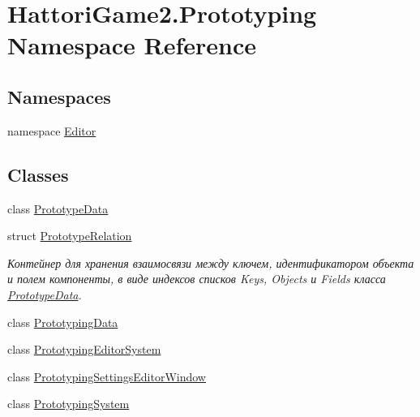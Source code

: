 \hypertarget{namespace_hattori_game2_1_1_prototyping}{}\section{Hattori\+Game2.\+Prototyping Namespace Reference}
\label{namespace_hattori_game2_1_1_prototyping}
\subsection*{Namespaces}
\begin{DoxyCompactItemize}
\item 
namespace \hyperlink{namespace_hattori_game2_1_1_prototyping_1_1_editor}{Editor}
\end{DoxyCompactItemize}
\subsection*{Classes}
\begin{DoxyCompactItemize}
\item 
class \hyperlink{class_hattori_game2_1_1_prototyping_1_1_prototype_data}{Prototype\+Data}
\item 
struct \hyperlink{struct_hattori_game2_1_1_prototyping_1_1_prototype_relation}{Prototype\+Relation}
\begin{DoxyCompactList}\small\item\em Контейнер для хранения взаимосвязи между ключем, идентификатором объекта и полем компоненты, в виде индексов списков {\ttfamily Keys}, {\ttfamily Objects} и {\ttfamily Fields} класса \hyperlink{class_hattori_game2_1_1_prototyping_1_1_prototype_data}{Prototype\+Data}. \end{DoxyCompactList}\item 
class \hyperlink{class_hattori_game2_1_1_prototyping_1_1_prototyping_data}{Prototyping\+Data}
\item 
class \hyperlink{class_hattori_game2_1_1_prototyping_1_1_prototyping_editor_system}{Prototyping\+Editor\+System}
\item 
class \hyperlink{class_hattori_game2_1_1_prototyping_1_1_prototyping_settings_editor_window}{Prototyping\+Settings\+Editor\+Window}
\item 
class \hyperlink{class_hattori_game2_1_1_prototyping_1_1_prototyping_system}{Prototyping\+System}
\end{DoxyCompactItemize}
